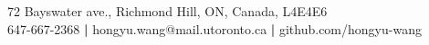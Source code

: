 \documentclass[letterpaper,11pt]{article}
\begin{document}

\vspace{0.1in}

\begin{center}
	\begin{small}
	72 Bayswater ave., Richmond Hill, ON, Canada, L4E4E6\\
	647-667-2368 \textbf{\large |}
	hongyu.wang@mail.utoronto.ca \textbf{\large |}
	github.com/hongyu-wang
	\end{small}

\end{center}








\vspace{0.1in}









\end{document}
